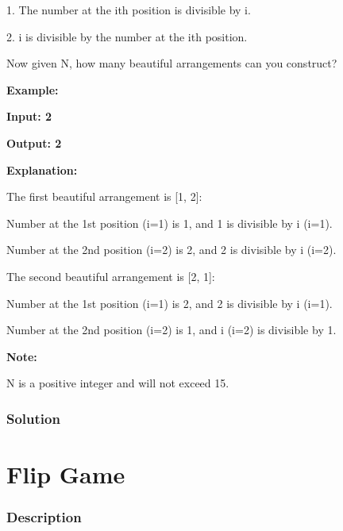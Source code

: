 1. The number at the ith position is divisible by i.

2. i is divisible by the number at the ith position.

Now given N, how many beautiful arrangements can you construct?

\textbf{Example:}

\textbf{Input: 2}

\textbf{Output: 2}

\textbf{Explanation:}

The first beautiful arrangement is [1, 2]:

Number at the 1st position (i=1) is 1, and 1 is divisible by i (i=1).

Number at the 2nd position (i=2) is 2, and 2 is divisible by i (i=2).

The second beautiful arrangement is [2, 1]:

Number at the 1st position (i=1) is 2, and 2 is divisible by i (i=1).

Number at the 2nd position (i=2) is 1, and i (i=2) is divisible by 1.

\textbf{Note:}

N is a positive integer and will not exceed 15.

\subsubsection{Solution}

\newpage

\section{Flip Game} %
\subsubsection{Description}

